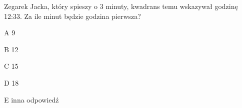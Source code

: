 \begin{tresc}
Zegarek Jacka, który spieszy o 3 minuty, kwadrans temu wskazywał godzinę 12:33. Za ile minut będzie godzina pierwsza?
\end{tresc}
\begin{wariant}{A} 9 \end{wariant}
\begin{wariant}{B} 12 \end{wariant}
\begin{wariant}{C} 15 \end{wariant}
\begin{wariant}{D} 18 \end{wariant}
\begin{wariant}{E} inna odpowiedź \end{wariant}
